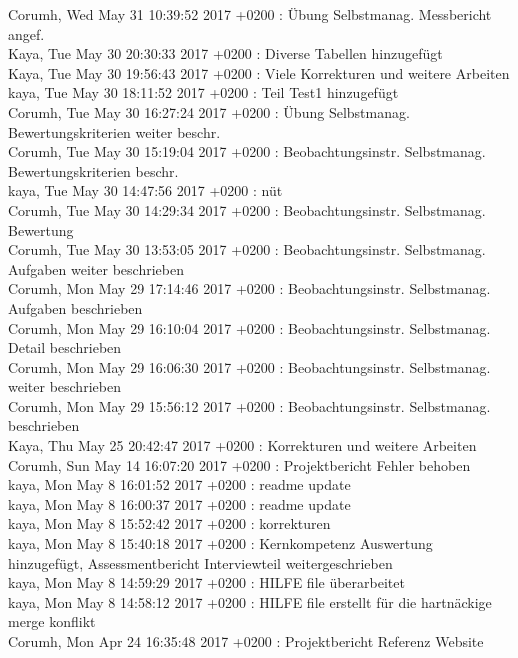 Corumh, Wed May 31 10:39:52 2017 +0200 : Übung Selbstmanag. Messbericht angef. \\
Kaya, Tue May 30 20:30:33 2017 +0200 : Diverse Tabellen hinzugefügt \\
Kaya, Tue May 30 19:56:43 2017 +0200 : Viele Korrekturen und weitere Arbeiten \\
kaya, Tue May 30 18:11:52 2017 +0200 : Teil Test1 hinzugefügt \\
Corumh, Tue May 30 16:27:24 2017 +0200 : Übung Selbstmanag. Bewertungskriterien weiter beschr. \\
Corumh, Tue May 30 15:19:04 2017 +0200 : Beobachtungsinstr. Selbstmanag. Bewertungskriterien beschr. \\
kaya, Tue May 30 14:47:56 2017 +0200 : nüt \\
Corumh, Tue May 30 14:29:34 2017 +0200 : Beobachtungsinstr. Selbstmanag. Bewertung \\
Corumh, Tue May 30 13:53:05 2017 +0200 : Beobachtungsinstr. Selbstmanag. Aufgaben weiter beschrieben \\
Corumh, Mon May 29 17:14:46 2017 +0200 : Beobachtungsinstr. Selbstmanag. Aufgaben beschrieben \\
Corumh, Mon May 29 16:10:04 2017 +0200 : Beobachtungsinstr. Selbstmanag. Detail beschrieben \\
Corumh, Mon May 29 16:06:30 2017 +0200 : Beobachtungsinstr. Selbstmanag. weiter beschrieben \\
Corumh, Mon May 29 15:56:12 2017 +0200 : Beobachtungsinstr. Selbstmanag. beschrieben \\
Kaya, Thu May 25 20:42:47 2017 +0200 : Korrekturen und weitere Arbeiten \\
Corumh, Sun May 14 16:07:20 2017 +0200 : Projektbericht Fehler behoben \\
kaya, Mon May 8 16:01:52 2017 +0200 : readme update \\
kaya, Mon May 8 16:00:37 2017 +0200 : readme update \\
kaya, Mon May 8 15:52:42 2017 +0200 : korrekturen \\
kaya, Mon May 8 15:40:18 2017 +0200 : Kernkompetenz Auswertung hinzugefügt, Assessmentbericht Interviewteil weitergeschrieben \\
kaya, Mon May 8 14:59:29 2017 +0200 : HILFE file überarbeitet \\
kaya, Mon May 8 14:58:12 2017 +0200 : HILFE file erstellt für die hartnäckige merge konflikt \\
Corumh, Mon Apr 24 16:35:48 2017 +0200 : Projektbericht Referenz Website \\
